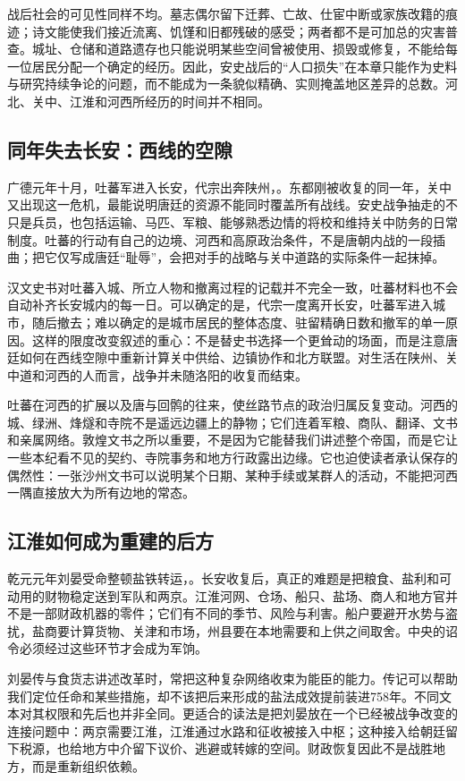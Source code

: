 战后社会的可见性同样不均。墓志偶尔留下迁葬、亡故、仕宦中断或家族改籍的痕迹；诗文能使我们接近流离、饥馑和旧都残破的感受；两者都不是可加总的灾害普查。城址、仓储和道路遗存也只能说明某些空间曾被使用、损毁或修复，不能给每一位居民分配一个确定的经历。因此，安史战后的“人口损失”在本章只能作为史料与研究持续争论的问题，而不能成为一条貌似精确、实则掩盖地区差异的总数。河北、关中、江淮和河西所经历的时间并不相同。

\subsection{同年失去长安：西线的空隙}
广德元年十月，吐蕃军进入长安，代宗出奔陕州，。东都刚被收复的同一年，关中又出现这一危机，最能说明唐廷的资源不能同时覆盖所有战线。安史战争抽走的不只是兵员，也包括运输、马匹、军粮、能够熟悉边情的将校和维持关中防务的日常制度。吐蕃的行动有自己的边境、河西和高原政治条件，不是唐朝内战的一段插曲；把它仅写成唐廷“耻辱”，会把对手的战略与关中道路的实际条件一起抹掉。

汉文史书对吐蕃入城、所立人物和撤离过程的记载并不完全一致，吐蕃材料也不会自动补齐长安城内的每一日。可以确定的是，代宗一度离开长安，吐蕃军进入城市，随后撤去；难以确定的是城市居民的整体态度、驻留精确日数和撤军的单一原因。这样的限度改变叙述的重心：不是替史书选择一个更耸动的场面，而是注意唐廷如何在西线空隙中重新计算关中供给、边镇协作和北方联盟。对生活在陕州、关中道和河西的人而言，战争并未随洛阳的收复而结束。

吐蕃在河西的扩展以及唐与回鹘的往来，使丝路节点的政治归属反复变动。河西的城、绿洲、烽燧和寺院不是遥远边疆上的静物；它们连着军粮、商队、翻译、文书和亲属网络。敦煌文书之所以重要，不是因为它能替我们讲述整个帝国，而是它让一些本纪看不见的契约、寺院事务和地方行政露出边缘。它也迫使读者承认保存的偶然性：一张沙州文书可以说明某个日期、某种手续或某群人的活动，不能把河西一隅直接放大为所有边地的常态。

\subsection{江淮如何成为重建的后方}
乾元元年刘晏受命整顿盐铁转运，。长安收复后，真正的难题是把粮食、盐利和可动用的财物稳定送到军队和两京。江淮河网、仓场、船只、盐场、商人和地方官并不是一部财政机器的零件；它们有不同的季节、风险与利害。船户要避开水势与盗扰，盐商要计算货物、关津和市场，州县要在本地需要和上供之间取舍。中央的诏令必须经过这些环节才会成为军饷。

刘晏传与食货志讲述改革时，常把这种复杂网络收束为能臣的能力。传记可以帮助我们定位任命和某些措施，却不该把后来形成的盐法成效提前装进758年。不同文本对其权限和先后也并非全同。更适合的读法是把刘晏放在一个已经被战争改变的连接问题中：两京需要江淮，江淮通过水路和征收被接入中枢；这种接入给朝廷留下税源，也给地方中介留下议价、逃避或转嫁的空间。财政恢复因此不是战胜地方，而是重新组织依赖。

